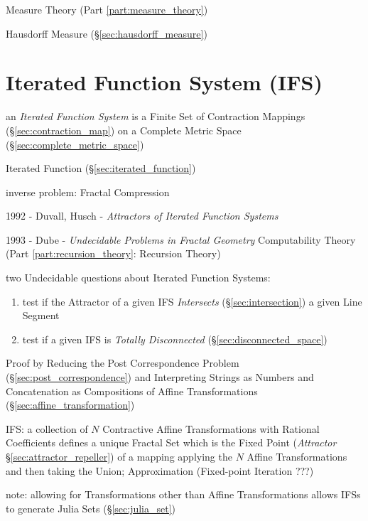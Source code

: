 \fist Measure Theory (Part \ref{part:measure_theory})

\fist Hausdorff Measure (\S\ref{sec:hausdorff_measure})



\section{Iterated Function System (IFS)}\label{sec:ifs}

an \emph{Iterated Function System} is a Finite Set of Contraction Mappings
(\S\ref{sec:contraction_map}) on a Complete Metric Space
(\S\ref{sec:complete_metric_space})

Iterated Function (\S\ref{sec:iterated_function})

inverse problem: Fractal Compression

1992 - Duvall, Husch - \emph{Attractors of Iterated Function Systems}

\asterism

1993 - Dube - \emph{Undecidable Problems in Fractal Geometry} \fist
Computability Theory (Part \ref{part:recursion_theory}: Recursion Theory)

two Undecidable questions about Iterated Function Systems:
\begin{enumerate}
  \item test if the Attractor of a given IFS \emph{Intersects}
    (\S\ref{sec:intersection}) a given Line Segment
  \item test if a given IFS is \emph{Totally Disconnected}
    (\S\ref{sec:disconnected_space})
\end{enumerate}

Proof by Reducing the Post Correspondence Problem
(\S\ref{sec:post_correspondence}) and Interpreting Strings as Numbers and
Concatenation as Compositions of Affine Transformations
(\S\ref{sec:affine_transformation})

IFS: a collection of $N$ Contractive Affine Transformations with Rational
Coefficients defines a unique Fractal Set which is the Fixed Point
(\emph{Attractor} \S\ref{sec:attractor_repeller}) of a mapping applying the $N$
Affine Transformations and then taking the Union; Approximation (Fixed-point
Iteration ???)

note: allowing for Transformations other than Affine Transformations allows IFSs
to generate Julia Sets (\S\ref{sec:julia_set})


